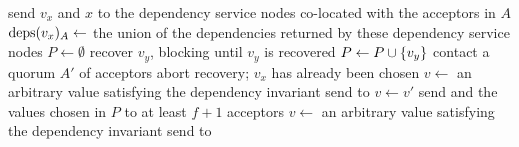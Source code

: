 \begin{algorithm*}[ht]
\begin{algorithmic}[1]
        \State send $v_x$ and $x$ to the dependency service nodes co-located
               with the acceptors in $A$
        \State $\text{deps}(v_x)_A \gets$ the union of the dependencies returned by
               these dependency service nodes
        \State
        \State $P \gets \emptyset$
            \State recover $v_y$, blocking until $v_y$ is recovered
          \EndIf
            \State $P \gets P \cup \{v_y\}$
          \Else{}
            \State contact a quorum $A'$ of acceptors
              \State abort recovery; $v_x$ has already been chosen
            \Else{}
              \State $v \gets$ an arbitrary value satisfying the dependency invariant
              \State send  to 
            \EndIf{}
          \EndIf{}
        \EndFor{}
        \State $v \gets v'$
        \State send  and the values chosen in $P$ to at
               least $f + 1$ acceptors
      \Else{} 
        \State $v \gets$ an arbitrary value satisfying the dependency invariant
        \State send  to 
      \EndIf
    \EndUpon
  \end{algorithmic}
\end{algorithm*}
